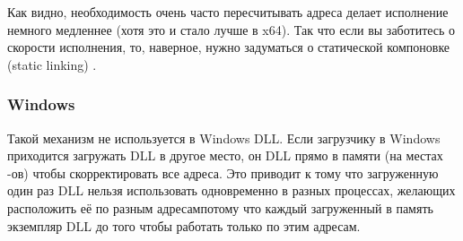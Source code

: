 Как видно, необходимость очень часто пересчитывать адреса делает исполнение немного медленнее 
(хотя это и стало лучше в x64).
Так что если вы заботитесь о скорости исполнения, то, наверное, нужно задуматься о статической компоновке (static linking)
.

\subsubsection{Windows}

Такой механизм не используется в Windows DLL. Если загрузчику в Windows приходится загружать DLL 
в другое место, он  DLL прямо в памяти (на местах -ов) чтобы скорректировать 
все адреса.
Это приводит к тому что загруженную один раз DLL нельзя использовать одновременно в разных 
процессах, желающих расположить её по разным адресам\EMDASH{}потому что каждый загруженный в память 
экземпляр DLL  до того чтобы работать только по этим адресам.

